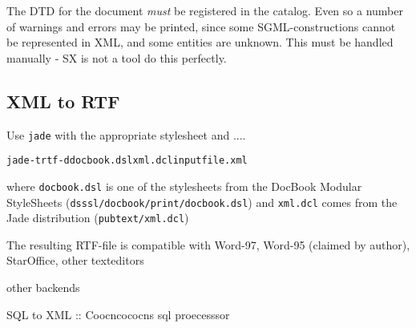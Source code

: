 The DTD for the document \textit{must} be registered in the
\textsf{catalog}.  Even so a number of warnings and errors may be
printed, since some SGML-constructions cannot be represented in XML,
and some entities are unknown.  This must be handled manually - SX is
not a tool do this perfectly.


\subsection{XML to RTF}
\label{sec:docbook-xml-to-rtf}

Use \texttt{jade} with the appropriate stylesheet and \textsf{....}

\begin{alltt}
         jade -t rtf -d docbook.dsl xml.dcl inputfile.xml
\end{alltt}

where \texttt{docbook.dsl} is one of the stylesheets from the
\textsf{DocBook Modular StyleSheets}
(\texttt{dsssl/docbook/print/docbook.dsl}) and \texttt{xml.dcl} comes
from the Jade distribution (\texttt{pubtext/xml.dcl})

The resulting RTF-file is compatible with Word-97, Word-95 (claimed by
author), StarOffice, \textsf{other texteditors} 

\textsf{other backends}

SQL to XML :: Coocncococns sql proecesssor


